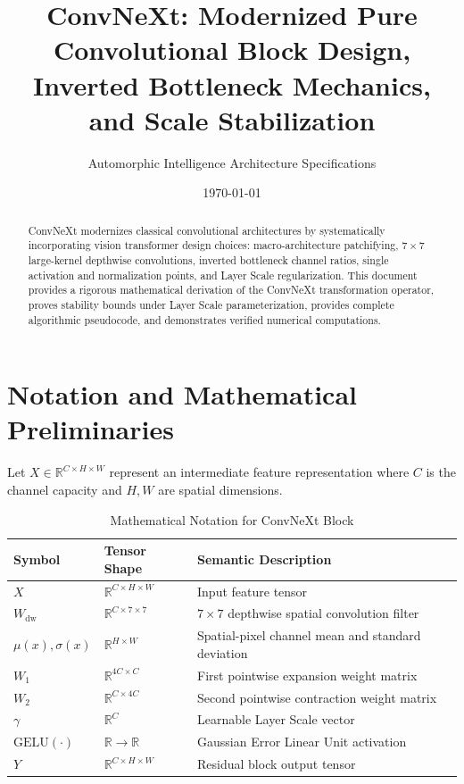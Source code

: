 \documentclass[11pt,a4paper]{article}
\title{ConvNeXt: Modernized Pure Convolutional Block Design, Inverted Bottleneck Mechanics, and Scale Stabilization}
\author{Automorphic Intelligence Architecture Specifications}
\date{\today}
\theoremstyle{definition}
\begin{document}
\maketitle

\begin{abstract}
ConvNeXt modernizes classical convolutional architectures by systematically incorporating vision transformer design choices: macro-architecture patchifying, $7 \times 7$ large-kernel depthwise convolutions, inverted bottleneck channel ratios, single activation and normalization points, and Layer Scale regularization. This document provides a rigorous mathematical derivation of the ConvNeXt transformation operator, proves stability bounds under Layer Scale parameterization, provides complete algorithmic pseudocode, and demonstrates verified numerical computations.
\end{abstract}

\section{Notation and Mathematical Preliminaries}

Let $X \in \mathbb{R}^{C \times H \times W}$ represent an intermediate feature representation where $C$ is the channel capacity and $H, W$ are spatial dimensions.

\begin{table}[h]
\centering
\caption{Mathematical Notation for ConvNeXt Block}
\begin{tabular}{lll}
\toprule
\textbf{Symbol} & \textbf{Tensor Shape} & \textbf{Semantic Description} \\
\midrule
$X$ & $\mathbb{R}^{C \times H \times W}$ & Input feature tensor \\
$W_{\text{dw}}$ & $\mathbb{R}^{C \times 7 \times 7}$ & $7 \times 7$ depthwise spatial convolution filter \\
$\mu(x), \sigma(x)$ & $\mathbb{R}^{H \times W}$ & Spatial-pixel channel mean and standard deviation \\
$W_1$ & $\mathbb{R}^{4C \times C}$ & First pointwise expansion weight matrix \\
$W_2$ & $\mathbb{R}^{C \times 4C}$ & Second pointwise contraction weight matrix \\
$\gamma$ & $\mathbb{R}^C$ & Learnable Layer Scale vector \\
$\text{GELU}(\cdot)$ & $\mathbb{R} \to \mathbb{R}$ & Gaussian Error Linear Unit activation \\
$Y$ & $\mathbb{R}^{C \times H \times W}$ & Residual block output tensor \\
\bottomrule
\end{tabular}
\end{table}
\end{document}
